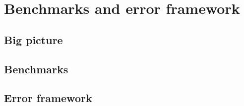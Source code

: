 
\chapter*{Benchmarks and error framework}
\label{sec:org5473f3e}
\section*{Big picture}
\label{sec:org10cc725}

\section*{Benchmarks}
\label{sec:org3814028}
\section*{Error framework}
\label{sec:org4c15523}
